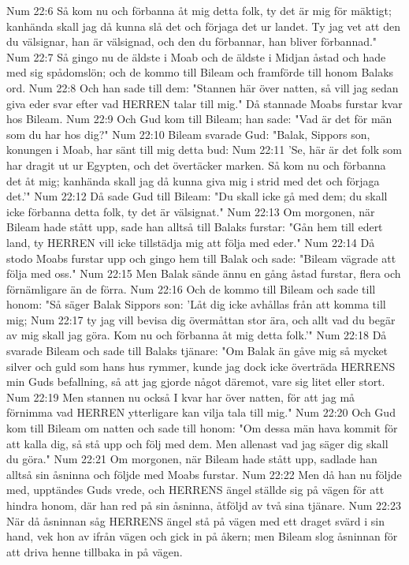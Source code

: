 Num 22:6  Så kom nu och förbanna åt mig detta folk, ty det är mig för mäktigt; kanhända skall jag då kunna slå det och förjaga det ur landet. Ty jag vet att den du välsignar, han är välsignad, och den du förbannar, han bliver förbannad."
Num 22:7  Så gingo nu de äldste i Moab och de äldste i Midjan åstad och hade med sig spådomslön; och de kommo till Bileam och framförde till honom Balaks ord.
Num 22:8  Och han sade till dem: "Stannen här över natten, så vill jag sedan giva eder svar efter vad HERREN talar till mig." Då stannade Moabs furstar kvar hos Bileam.
Num 22:9  Och Gud kom till Bileam; han sade: "Vad är det för män som du har hos dig?"
Num 22:10  Bileam svarade Gud: "Balak, Sippors son, konungen i Moab, har sänt till mig detta bud:
Num 22:11  'Se, här är det folk som har dragit ut ur Egypten, och det övertäcker marken. Så kom nu och förbanna det åt mig; kanhända skall jag då kunna giva mig i strid med det och förjaga det.'"
Num 22:12  Då sade Gud till Bileam: "Du skall icke gå med dem; du skall icke förbanna detta folk, ty det är välsignat."
Num 22:13  Om morgonen, när Bileam hade stått upp, sade han alltså till Balaks furstar: "Gån hem till edert land, ty HERREN vill icke tillstädja mig att följa med eder."
Num 22:14  Då stodo Moabs furstar upp och gingo hem till Balak och sade: "Bileam vägrade att följa med oss."
Num 22:15  Men Balak sände ännu en gång åstad furstar, flera och förnämligare än de förra.
Num 22:16  Och de kommo till Bileam och sade till honom: "Så säger Balak Sippors son: 'Låt dig icke avhållas från att komma till mig;
Num 22:17  ty jag vill bevisa dig övermåttan stor ära, och allt vad du begär av mig skall jag göra. Kom nu och förbanna åt mig detta folk.'"
Num 22:18  Då svarade Bileam och sade till Balaks tjänare: "Om Balak än gåve mig så mycket silver och guld som hans hus rymmer, kunde jag dock icke överträda HERRENS min Guds befallning, så att jag gjorde något däremot, vare sig litet eller stort.
Num 22:19  Men stannen nu också I kvar har över natten, för att jag må förnimma vad HERREN ytterligare kan vilja tala till mig."
Num 22:20  Och Gud kom till Bileam om natten och sade till honom: "Om dessa män hava kommit för att kalla dig, så stå upp och följ med dem. Men allenast vad jag säger dig skall du göra."
Num 22:21  Om morgonen, när Bileam hade stått upp, sadlade han alltså sin åsninna och följde med Moabs furstar.
Num 22:22  Men då han nu följde med, upptändes Guds vrede, och HERRENS ängel ställde sig på vägen för att hindra honom, där han red på sin åsninna, åtföljd av två sina tjänare.
Num 22:23  När då åsninnan såg HERRENS ängel stå på vägen med ett draget svärd i sin hand, vek hon av ifrån vägen och gick in på åkern; men Bileam slog åsninnan för att driva henne tillbaka in på vägen.
